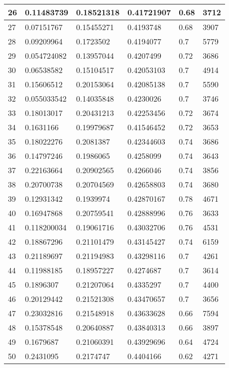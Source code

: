 \begin{longtable}{|l|l|l|l|l|l|}
26 & 0.11483739 & 0.18521318 & 0.41721907 & 0.68 & 3712 \\ \hline 
27 & 0.07151767 & 0.15455271 & 0.4193748 & 0.68 & 3907 \\ \hline 
28 & 0.09209964 & 0.1723502 & 0.4194077 & 0.7 & 5779 \\ \hline 
29 & 0.054724082 & 0.13957044 & 0.4207499 & 0.72 & 3686 \\ \hline 
30 & 0.06538582 & 0.15104517 & 0.42053103 & 0.7 & 4914 \\ \hline 
31 & 0.15606512 & 0.20153064 & 0.42085138 & 0.7 & 5590 \\ \hline 
32 & 0.055033542 & 0.14035848 & 0.4230026 & 0.7 & 3746 \\ \hline 
33 & 0.18013017 & 0.20431213 & 0.42253456 & 0.72 & 3674 \\ \hline 
34 & 0.1631166 & 0.19979687 & 0.41546452 & 0.72 & 3653 \\ \hline 
35 & 0.18022276 & 0.2081387 & 0.42344603 & 0.74 & 3686 \\ \hline 
36 & 0.14797246 & 0.1986065 & 0.4258099 & 0.74 & 3643 \\ \hline 
37 & 0.22163664 & 0.20902565 & 0.4266046 & 0.74 & 3856 \\ \hline 
38 & 0.20700738 & 0.20704569 & 0.42658803 & 0.74 & 3680 \\ \hline 
39 & 0.12931342 & 0.1939974 & 0.42870167 & 0.78 & 4671 \\ \hline 
40 & 0.16947868 & 0.20759541 & 0.42888996 & 0.76 & 3633 \\ \hline 
41 & 0.118200034 & 0.19061716 & 0.43032706 & 0.76 & 4531 \\ \hline 
42 & 0.18867296 & 0.21101479 & 0.43145427 & 0.74 & 6159 \\ \hline 
43 & 0.21189697 & 0.21194983 & 0.43298116 & 0.7 & 4261 \\ \hline 
44 & 0.11988185 & 0.18957227 & 0.4274687 & 0.7 & 3614 \\ \hline 
45 & 0.1896307 & 0.21207064 & 0.4335297 & 0.7 & 4400 \\ \hline 
46 & 0.20129442 & 0.21521308 & 0.43470657 & 0.7 & 3656 \\ \hline 
47 & 0.23032816 & 0.21548918 & 0.43633628 & 0.66 & 7594 \\ \hline 
48 & 0.15378548 & 0.20640887 & 0.43840313 & 0.66 & 3897 \\ \hline 
49 & 0.1679687 & 0.21060391 & 0.43929696 & 0.64 & 4724 \\ \hline 
50 & 0.2431095 & 0.2174747 & 0.4404166 & 0.62 & 4271 \\ \hline 
\end{longtable}
